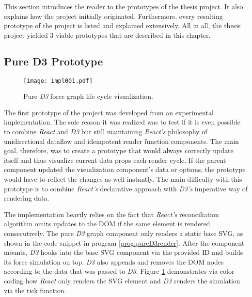 This section introduces the reader to the prototypes of the thesis project. It also explains how the project initially originated. Furthermore, every resulting prototype of the project is listed and explained extensively. All in all, the thesis project yielded 3 viable prototypes that are described in this chapter. 


\subsection{Pure D3 Prototype}
\label{sec:pureD3prototype}

\begin{figure}
\centering
\texttt{[image: impl001.pdf]}
\caption{Pure \emph{D3} force graph life cycle visualization.}
\label{fig:pureD3Lifecycle}
\end{figure}

The first prototype of the project was developed from an experimental implementation. The sole reason it was realized was to test if it is even possible to combine \emph{React} and \emph{D3} but still maintaining \emph{React's} philosophy of unidirectional dataflow and idempotent render function components. The main goal, therefore, was to create a prototype that would always correctly update itself and thus visualize current data props each render cycle. If the parent component updated the visualization component's data or options, the prototype would have to reflect the changes as well instantly. The main difficulty with this prototype is to combine \emph{React's} declarative approach with \emph{D3's} imperative way of rendering data.

The implementation heavily relies on the fact that \emph{React's} reconciliation algorithm omits updates to the DOM if the same element is rendered consecutively. The pure \emph{D3} graph component only renders a static base SVG, as shown in the code snippet in program \ref{prog:pureD3render}. After the component mounts, \emph{D3} hooks into the base SVG component via the provided ID and builds its force simulation on top. \emph{D3} also appends and removes the DOM nodes according to the data that was passed to \emph{D3}. Figure \ref{fig:pureD3Lifecycle} demonstrates via color coding how \emph{React} only renders the SVG element and \emph{D3} renders the simulation via the tick function.

